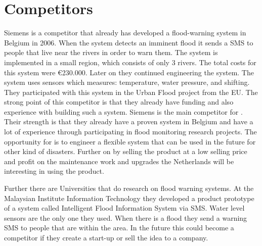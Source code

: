 \section{Competitors}
Siemens is a competitor that already has developed a flood-warning system in Belgium in 2006. When the system detects an imminent flood it sends a SMS to people that live near the rivers in order to warn them. The system is implemented in a small region, which consists of only 3 rivers. The total costs for this system were \euro{}230.000. Later on they continued engineering the system. The system uses sensors which measures: temperature, water pressure, and shifting. They participated with this system in the Urban Flood project from the EU. The strong point of this competitor is that they already have funding and also experience with building such a system. Siemens is the main competitor for \CompanyName{}. Their strength is that they already have a proven system in Belgium and have a lot of experience through participating in flood monitoring research projects. The opportunity for \CompanyName{} is to engineer a flexible system that can be used in the future for other kind of disasters. Further on by selling the product at a low selling price and profit on the maintenance work and upgrades the Netherlands will be interesting in using the product.

Further there are Universities that do research on flood warning systems. At the Malaysian Institute Information Technology they developed a product prototype of a system called Intelligent Flood Information System via SMS. Water level sensors are the only one they used. When there is a flood they send a warning SMS to people that are within the area. In the future this could become a competitor if they create a start-up or sell the idea to a company.  



